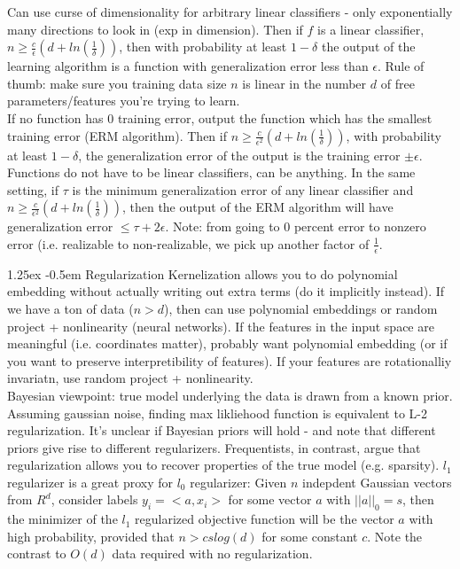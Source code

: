 \documentclass[8pt]{article}
\makeatletter
\newlength{\norm}
\newlength{\nrm}
\newlength{\sm}
\renewcommand{\paragraph}{%
  \@startsection{paragraph}{4}%
  {\z@}{1.25ex \@plus 2pt \@minus 2pt}{-0.5em}%
  {\fontsize{\f@size}{\nrm}\normalfont\bfseries}%
}
\makeatother
\begin{document}
{\begin{multicols*}{5}
Can use curse of dimensionality for arbitrary linear classifiers - only exponentially many directions to look in (exp in dimension). Then if $f$ is a linear classifier, $n \geq \frac{c}{\epsilon}(d + ln(\frac{1}{\delta}))$, then with probability at least $1 - \delta$  the output of the learning algorithm is a function with generalization error less than $\epsilon$. Rule of thumb: make sure you training data size $n$ is linear in the number $d$ of free parameters/features you're trying to learn. \\

If no function has 0 training error, output the function which has the smallest training error (ERM algorithm). Then if $n \geq \frac{c}{\epsilon^2}(d + ln(\frac{1}{\delta}))$, with probability at least $1 - \delta$, the generalization error of the output is the training error $\pm \epsilon$. Functions do not have to be linear classifiers, can be anything. In the same setting, if $\tau$ is the minimum generalization error of any linear classifier and $n \geq \frac{c}{\epsilon^2}(d + ln(\frac{1}{\delta}))$, then the output of the ERM algorithm will have generalization error $\leq \tau + 2\epsilon$. Note: from going to 0 percent error to nonzero error (i.e. realizable to non-realizable, we pick up another factor of $\frac{1}{\epsilon}$. 

\paragraph{Regularization} Kernelization allows you to do polynomial embedding without actually writing out extra terms (do it implicitly instead). If we have a ton of data ($n > d$), then can use polynomial embeddings or random project + nonlinearity (neural networks). If the features in the input space are meaningful (i.e. coordinates matter), probably want polynomial embedding (or if you want to preserve interpretibility of features). If your features are rotationalliy invariatn, use random project + nonlinearity.\\

Bayesian viewpoint: true model underlying the data is drawn from a known prior. Assuming gaussian noise, finding max likliehood function is equivalent to L-2 regularization. It's unclear if Bayesian priors will hold - and note that different priors give rise to different regularizers. Frequentists, in contrast, argue that regularization allows you to recover properties of the true model (e.g. sparsity). $l_1$ regularizer is a great proxy for $l_0$ regularizer: Given $n$ indepdent Gaussian vectors from $R^d$, consider labels $y_i = <a,x_i>$ for some vector $a$ with $||a||_0 = s$, then the minimizer of the $l_1$ regularized objective function will be the vector $a$ with high probability, provided that $n > c s log(d)$ for some constant $c$. Note the contrast to $O(d)$ data required with no regularization. 




\end{multicols*}}
\end{document}
